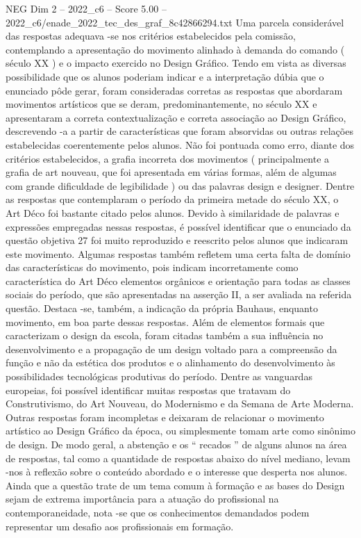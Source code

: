\begin{textsample}{NEG Dim 2 – 2022\_c6 – Score 5.00 – 2022\_c6/enade\_2022\_tec\_des\_graf\_8c42866294.txt}
Uma parcela considerável das respostas adequava -se nos critérios estabelecidos pela comissão, contemplando a apresentação do movimento alinhado à demanda do comando ( século XX ) e o impacto exercido no Design Gráfico.
Tendo em vista as diversas possibilidade que os alunos poderiam indicar e a interpretação dúbia que o enunciado pôde gerar, foram consideradas corretas as respostas que abordaram movimentos artísticos que se deram, predominantemente, no século XX e apresentaram a correta contextualização e correta associação ao Design Gráfico, descrevendo -a a partir de características que foram absorvidas ou outras relações estabelecidas coerentemente pelos alunos.
Não foi pontuada como erro, diante dos critérios estabelecidos, a grafia incorreta dos movimentos ( principalmente a grafia de art nouveau, que foi apresentada em várias formas, além de algumas com grande dificuldade de legibilidade ) ou das palavras design e designer.
Dentre as respostas que contemplaram o período da primeira metade do século XX, o Art Déco foi bastante citado pelos alunos.
Devido à similaridade de palavras e expressões empregadas nessas respostas, é possível identificar que o enunciado da questão objetiva 27 foi muito reproduzido e reescrito pelos alunos que indicaram este movimento.
Algumas respostas também refletem uma certa falta de domínio das características do movimento, pois indicam incorretamente como característica do Art Déco elementos orgânicos e orientação para todas as classes sociais do período, que são apresentadas na asserção II, a ser avaliada na referida questão.
Destaca -se, também, a indicação da própria Bauhaus, enquanto movimento, em boa parte dessas respostas.
Além de elementos formais que caracterizam o design da escola, foram citadas também a sua influência no desenvolvimento e a propagação de um design voltado para a compreensão da função e não da estética dos produtos e o alinhamento do desenvolvimento às possibilidades tecnológicas produtivas do período.
Dentre as vanguardas europeias, foi possível identificar muitas respostas que tratavam do Construtivismo, do Art Nouveau, do Modernismo e da Semana de Arte Moderna.
Outras respostas foram incompletas e deixaram de relacionar o movimento artístico ao Design Gráfico da época, ou simplesmente tomam arte como sinônimo de design.
De modo geral, a abstenção e os “ recados ” de alguns alunos na área de respostas, tal como a quantidade de respostas abaixo do nível mediano, levam -nos à reflexão sobre o conteúdo abordado e o interesse que desperta nos alunos.
Ainda que a questão trate de um tema comum à formação e as bases do Design sejam de extrema importância para a atuação do profissional na contemporaneidade, nota -se que os conhecimentos demandados podem representar um desafio aos profissionais em formação.

\end{textsample}

